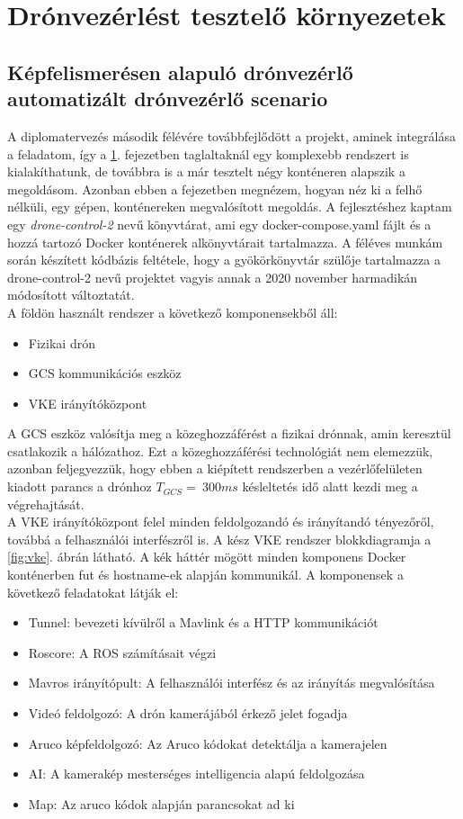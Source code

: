 \chapter{Drónvezérlést tesztelő környezetek}
\label{chap:vmtest}

\section{Képfelismerésen alapuló drónvezérlő automatizált drónvezérlő scenario}
\label{cha:fizikai}
A diplomatervezés második félévére továbbfejlődött a projekt, aminek integrálása a feladatom, így a \ref{chap:vmtest}. fejezetben taglaltaknál egy komplexebb rendszert is kialakíthatunk, de továbbra is a már tesztelt négy konténeren alapszik a megoldásom. Azonban ebben a fejezetben megnézem, hogyan néz ki a felhő nélküli, egy gépen, konténereken megvalósított megoldás. A fejlesztéshez kaptam egy \emph{drone-control-2} nevű könyvtárat, ami egy docker-compose.yaml fájlt és a hozzá tartozó Docker konténerek alkönyvtárait tartalmazza. A féléves munkám során készített kódbázis feltétele, hogy a gyökörkönyvtár szülője tartalmazza a drone-control-2 nevű projektet vagyis annak a 2020 november harmadikán módosított változtatát. \\

\noindent
A földön használt rendszer a következő komponensekből áll:
\begin{itemize}
	\item Fizikai drón
	\item GCS kommunikációs eszköz
	\item VKE irányítóközpont
\end{itemize}

\noindent
A GCS eszköz valósítja meg a közeghozzáférést a fizikai drónnak, amin keresztül csatlakozik a hálózathoz. Ezt a közeghozzáférési technológiát nem elemezzük, azonban feljegyezzük, hogy ebben a kiépített rendszerben a vezérlőfelületen kiadott parancs a drónhoz $T_{GCS} = ~300 ms$ késleltetés idő alatt kezdi meg a végrehajtását. \\

\noindent
A VKE irányítóközpont felel minden feldolgozandó és irányítandó tényezőről, továbbá a felhasználói interfészről is. A kész VKE rendszer blokkdiagramja a \ref{fig:vke}. ábrán látható. A kék háttér mögött minden komponens Docker konténerben fut és hostname-ek alapján kommunikál. A komponensek a következő feladatokat látják el:
\begin{itemize}
	\item Tunnel: bevezeti kívülről a Mavlink és a HTTP kommunikációt
	\item Roscore: A ROS számításait végzi
	\item Mavros irányítópult: A felhasználói interfész és az irányítás megvalósítása
	\item Videó feldolgozó: A drón kamerájából érkező jelet fogadja
	\item Aruco képfeldolgozó: Az Aruco kódokat detektálja a kamerajelen
	\item AI: A kamerakép mesterséges intelligencia alapú feldolgozása
	\item Map: Az aruco kódok alapján parancsokat ad ki
\end{itemize}


